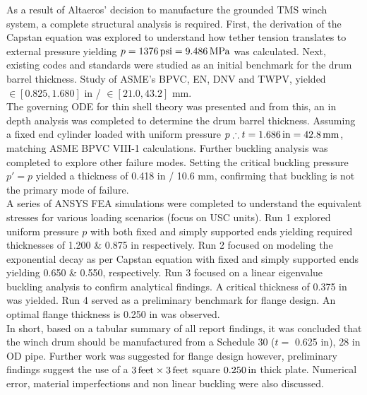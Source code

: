 As a result of Altaeros' decision to manufacture the grounded TMS winch system, a complete structural analysis is required. First, the derivation of the Capstan equation was explored to understand how tether tension translates to external pressure yielding $p=1376\,\mathrm{psi}= 9.486\,\mathrm{MPa}$ was calculated. Next, existing codes and standards were studied as an initial benchmark for the drum barrel thickness. Study of ASME's BPVC, EN, DNV and TWPV, yielded $\in [0.825, 1.680]$ in / $\in [21.0, 43.2]$ mm.\\

The governing ODE for thin shell theory was presented and from this, an in depth analysis was completed to determine the drum barrel thickness. Assuming a fixed end cylinder loaded with uniform pressure $p \therefore t = 1.686\,\mathrm{in}=42.8\,\mathrm{mm}$, matching ASME BPVC VIII-1 calculations. Further buckling analysis was completed to explore other failure modes. Setting the critical buckling pressure $p'=p$ yielded a thickness of 0.418 in / 10.6 mm, confirming that buckling is not the primary mode of failure.\\

A series of ANSYS FEA simulations were completed to understand the equivalent stresses for various loading scenarios (focus on USC units). Run 1 explored uniform pressure $p$ with both fixed and simply supported ends yielding required thicknesses of 1.200 \& 0.875 in respectively. Run 2 focused on modeling the exponential decay as per Capstan equation with fixed and simply supported ends yielding 0.650 \& 0.550, respectively. Run 3 focused on a linear eigenvalue buckling analysis to confirm analytical findings. A critical thickness of 0.375 in was yielded. Run 4 served as a preliminary benchmark for flange design. An optimal flange thickness is 0.250 in was observed.\\

In short, based on a tabular summary of all report findings, it was concluded that the winch drum should be manufactured from a Schedule 30 ($t=$ 0.625 in), 28 in OD pipe. Further work was suggested for flange design however, preliminary findings suggest the use of a $3\,\mathrm{feet}\times 3\,\mathrm{feet}$ square $0.250\,\mathrm{in}$ thick plate. Numerical error, material imperfections and non linear buckling were also discussed.